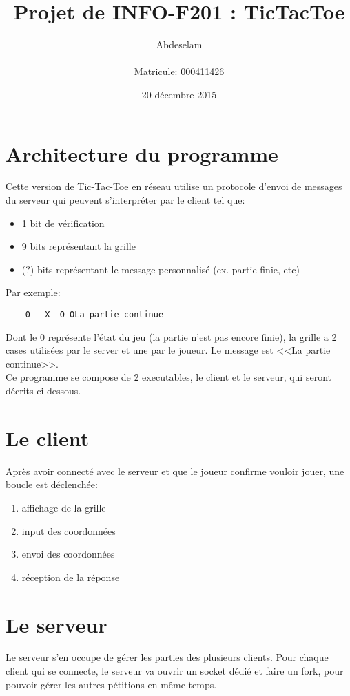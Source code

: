 \documentclass{article}
\title{Projet de INFO-F201 : \og TicTacToe\fg\\}
\author{Abdeselam \bsc{El-Haman Abdeselam}\\\\Matricule: 000411426}
\date{20 décembre 2015}
\begin{document}
\maketitle

\section*{Architecture du programme}
	Cette version de Tic-Tac-Toe en réseau utilise un protocole d'envoi de messages du serveur qui peuvent s'interpréter par le client tel que:

\begin{itemize}
	\item 1 bit de vérification
	\item 9 bits représentant la grille 
	\item (?) bits représentant le message personnalisé (ex. partie finie, etc)\\
\end{itemize}	
Par exemple:
	\begin{verbatim}
	0   X  O OLa partie continue
	\end{verbatim}
	Dont le 0 représente l'état du jeu (la partie n'est pas encore finie), la grille a 2 cases utilisées par le server et une par le joueur. Le message est <<La partie continue>>.\\
	
	Ce programme se compose de 2 executables, le client et le serveur, qui seront décrits ci-dessous.
	
\section*{Le client}
	Après avoir connecté avec le serveur et que le joueur confirme vouloir jouer, une boucle est déclenchée:
	\begin{enumerate}
		\item affichage de la grille
		\item input des coordonnées
		\item envoi des coordonnées
		\item réception de la réponse\\
	\end{enumerate}
	
\section*{Le serveur}
	Le serveur s'en occupe de gérer les parties des plusieurs clients. Pour chaque client qui se connecte, le serveur va ouvrir un socket dédié et faire un fork, pour pouvoir gérer les autres pétitions en même temps.\\
	
	
\end{document}
